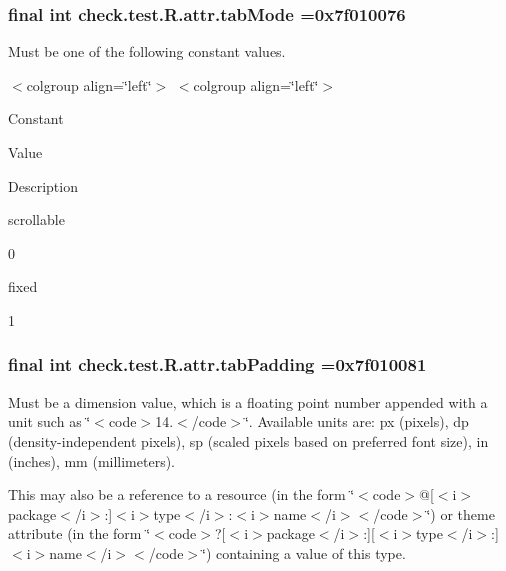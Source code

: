 \subsubsection[{tab\+Mode}]{\setlength{\rightskip}{0pt plus 5cm}final int check.\+test.\+R.\+attr.\+tab\+Mode =0x7f010076\hspace{0.3cm}{\ttfamily [static]}}\label{classcheck_1_1test_1_1_r_1_1attr_a813adba1ffde6ec58ce835911d9db617}
Must be one of the following constant values.

\begin{TabularC}{0}
\hline
\end{TabularC}
$<$colgroup align=\char`\"{}left\char`\"{}$>$ $<$colgroup align=\char`\"{}left\char`\"{}$>$ 

Constant

Value

Description 

{\ttfamily scrollable}

0

{\ttfamily fixed}

1\hypertarget{classcheck_1_1test_1_1_r_1_1attr_a7a7f8dc9a8192875a3695243aa9e8285}{}
\subsubsection[{tab\+Padding}]{\setlength{\rightskip}{0pt plus 5cm}final int check.\+test.\+R.\+attr.\+tab\+Padding =0x7f010081\hspace{0.3cm}{\ttfamily [static]}}\label{classcheck_1_1test_1_1_r_1_1attr_a7a7f8dc9a8192875a3695243aa9e8285}
Must be a dimension value, which is a floating point number appended with a unit such as \char`\"{}$<$code$>$14.\+5sp$<$/code$>$\char`\"{}. Available units are\+: px (pixels), dp (density-\/independent pixels), sp (scaled pixels based on preferred font size), in (inches), mm (millimeters). 

This may also be a reference to a resource (in the form \char`\"{}$<$code$>$@\mbox{[}$<$i$>$package$<$/i$>$\+:\mbox{]}$<$i$>$type$<$/i$>$\+:$<$i$>$name$<$/i$>$$<$/code$>$\char`\"{}) or theme attribute (in the form \char`\"{}$<$code$>$?\mbox{[}$<$i$>$package$<$/i$>$\+:\mbox{]}\mbox{[}$<$i$>$type$<$/i$>$\+:\mbox{]}$<$i$>$name$<$/i$>$$<$/code$>$\char`\"{}) containing a value of this type. \hypertarget{classcheck_1_1test_1_1_r_1_1attr_aa4e3f622e42c4b3fd08ed0f5308d4b2c}{}
